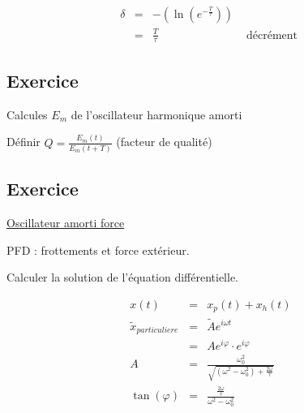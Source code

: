 	\[\begin{array}{rcll}
		\delta &=& -(\ln(e^{-\frac{T}{\tau}})) \\
						   &=& \frac{T}{\tau} & \text{ décrément }
	\end{array}\]

	\subsection{Exercice}
	Calcules $E_m$ de l'oscillateur harmonique amorti

	Définir $Q = \frac{E_m(t)}{E_m(t+T)}$ (facteur de qualité)

	\subsection{Exercice}
	\ul{Oscillateur amorti force}

	PFD : frottements et force extérieur.

	Calculer la solution de l'équation différentielle.

	\[\begin{array}{rcl}
			x(t) &=& x_p(t) + x_h(t) \\
			\tilde{x}_{particuliere} &=& \tilde{A}e^{i\omega t} \\
								   &=& Ae^{i\varphi } \cdot e^{i \varphi}\\
			A &=& \frac{\omega_0^2}{\sqrt{(\omega^2 - \omega_0^2) + \frac{2\omega}{\tau}}} \\
	\tan (\varphi) &=& \frac{\frac{2\omega}{\tau}}{\omega^2 - \omega_0^2} \end{array}\]
